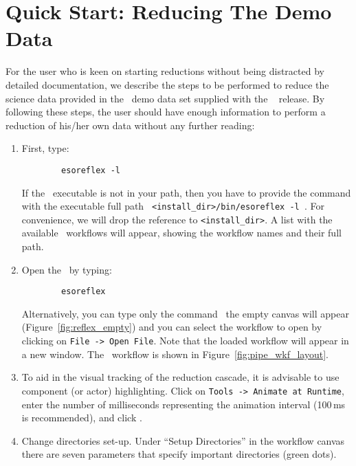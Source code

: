 \section{Quick Start: Reducing The Demo Data \label{sec:quick_start}}

For the user who is keen on starting reductions without being
distracted by detailed documentation, we describe the steps to be
performed to reduce the science data provided in the \instname\, demo
data set 
supplied with the \ {\tt {}} release. By following these
steps, the user should have enough information to perform a reduction
of his/her own data without any further reading:

\begin{enumerate}
  \item First, type:
        \begin{verbatim}
        esoreflex -l
        \end{verbatim}

    If the \ executable is not in your path, then you have
      to provide the command with the executable full path {\tt
        <install\_dir>/bin/esoreflex -l }. For convenience, we will
      drop the reference to {\tt <install\_dir>}. A list with the
      available \ workflows will appear, showing the workflow
      names and their full path.

   \item Open the \wkfname\ by typing:

\bigskip

      {\tt \ \ \ \ \ \ \ \ esoreflex} \wkfn {\tt \&}

\bigskip

      Alternatively, you can type only the command \, the empty
      canvas will appear (Figure~\ref{fig:reflex_empty}) and you can
      select the workflow to open by clicking on {\tt File -> Open
        File}. Note that the loaded workflow will appear in a new
      window. The \wkfname\ workflow is shown in
      Figure~\ref{fig:pipe_wkf_layout}. 

  \item To aid in the visual tracking of the reduction cascade, it is advisable
  to use component (or actor) highlighting. Click on {\tt Tools -> Animate at
  Runtime}, enter the number of milliseconds representing the animation
  interval (100\,ms is recommended), and click .

\item Change directories set-up. Under ``Setup Directories'' in the
  workflow canvas there are seven parameters that specify important
  directories (green dots).


\end{enumerate}
